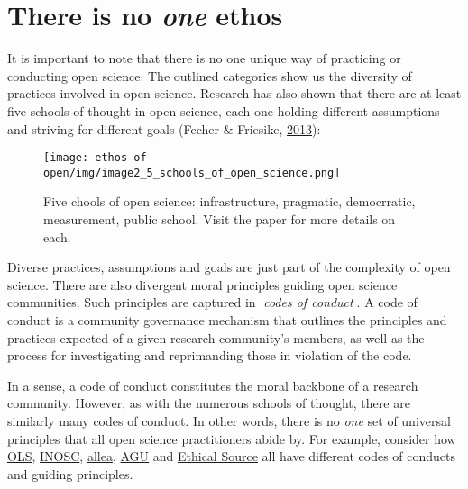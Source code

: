 \documentclass[
  letterpaper,
  DIV=11,
  numbers=noendperiod]{scrreport}
\begin{document}
\hypertarget{there-is-no-one-ethos}{%
\section*{\texorpdfstring{There is no \emph{one}
ethos}{There is no one ethos}}\label{there-is-no-one-ethos}}


It is important to note that there is no one unique way of practicing or
conducting open science. The outlined categories show us the diversity
of practices involved in open science. Research has also shown that
there are at least five schools of thought in open science, each one
holding different assumptions and striving for different goals (Fecher
\& Friesike, \href{https://doi.org/10.1007/978-3-319-00026-8_2}{2013}):

\begin{figure}

{\centering \texttt{[image: ethos-of-open/img/image2\_5\_schools\_of\_open\_science.png]}

}

\caption{Five chools of open science: infrastructure, pragmatic,
democrratic, measurement, public school. Visit the paper for more
details on each.}

\end{figure}

Diverse practices, assumptions and goals are just part of the complexity
of open science. There are also divergent moral principles guiding open
science communities. Such principles are captured in 📖\emph{codes of
conduct}📖. A code of conduct is a community governance mechanism that
outlines the principles and practices expected of a given research
community's members, as well as the process for investigating and
reprimanding those in violation of the code.

In a sense, a code of conduct constitutes the moral backbone of a
research community. However, as with the numerous schools of thought,
there are similarly many codes of conduct. In other words, there is no
\emph{one} set of universal principles that all open science
practitioners abide by. For example, consider how
\href{https://openlifesci.org/code-of-conduct}{OLS},
\href{https://osf.io/6gsye}{INOSC},
\href{https://allea.org/portfolio-item/the-european-code-of-conduct-for-research-integrity-2/}{allea},
\href{https://www.agu.org/Plan-for-a-Meeting/AGUMeetings/Meetings-Resources/Meetings-code-of-conduct}{AGU}
and \href{https://ethicalsource.dev/community-code-of-conduct/}{Ethical
Source} all have different codes of conducts and guiding principles.
\end{document}
